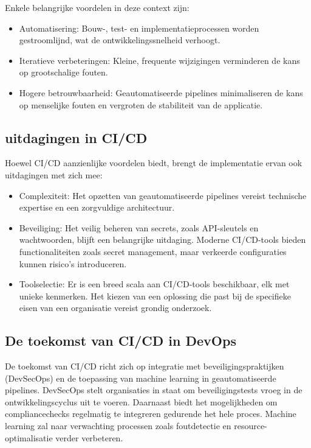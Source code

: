 Enkele belangrijke voordelen in deze context zijn:
\begin{itemize}
    \item Automatisering: Bouw-, test- en implementatieprocessen worden gestroomlijnd, wat de ontwikkelingssnelheid verhoogt.
    \item Iteratieve verbeteringen: Kleine, frequente wijzigingen verminderen de kans op grootschalige fouten.
    \item Hogere betrouwbaarheid: Geautomatiseerde pipelines minimaliseren de kans op menselijke fouten en vergroten de stabiliteit van de applicatie.
\end{itemize}


\subsection{uitdagingen in CI/CD}
Hoewel CI/CD aanzienlijke voordelen biedt, brengt de implementatie ervan ook uitdagingen met zich mee:
\begin{itemize}
    \item Complexiteit: Het opzetten van geautomatiseerde pipelines vereist technische expertise en een zorgvuldige architectuur. \autocite{Learn2024}
    \item Beveiliging: Het veilig beheren van secrets, zoals API-sleutels en wachtwoorden, blijft een belangrijke uitdaging. Moderne CI/CD-tools bieden functionaliteiten zoals secret management, maar verkeerde configuraties kunnen risico's introduceren. \autocite{atlassian2024}
    \item Toolselectie: Er is een breed scala aan CI/CD-tools beschikbaar, elk met unieke kenmerken. Het kiezen van een oplossing die past bij de specifieke eisen van een organisatie vereist grondig onderzoek. \autocite{true_cicd2024}
\end{itemize}


\subsection{De toekomst van CI/CD in DevOps}
De toekomst van CI/CD richt zich op integratie met beveiligingspraktijken (DevSecOps) en de toepassing van machine learning in geautomatiseerde pipelines. DevSecOps stelt organisaties in staat om beveiligingstests vroeg in de ontwikkelingscyclus uit te voeren. Daarnaast biedt het mogelijkheden om compliancechecks regelmatig te integreren gedurende het hele proces. Machine learning zal naar verwachting processen zoals foutdetectie en resource-optimalisatie verder verbeteren. \autocite{marques2023}

